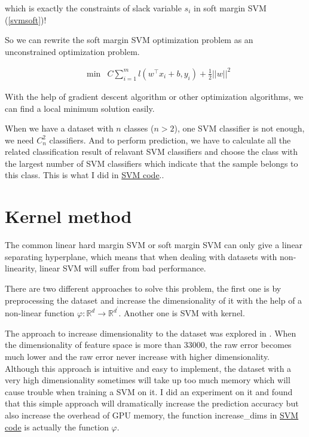 \documentclass[a4paper]{report}
\begin{document}
which is exactly the constraints of slack variable $s_i$ in soft margin SVM (\ref{svmsoft})!

So we can rewrite the soft margin SVM optimization problem as an unconstrained optimization problem.

\begin{align*}
    &\min & C \sum_{i=1}^m l(w^\top x_i+b, y_i) + \frac{1}{2}||w||^2 
\end{align*}

With the help of gradient descent algorithm or other optimization algorithms, we can find a local minimum solution easily.

When we have a dataset with $n$ classes ($n>2$), one SVM classifier is not enough, we need $C_n^2$ classifiers. And to perform prediction, we have to calculate all the related classification result of relavant SVM classifiers and choose the class with the largest number of SVM classifiers which indicate that the sample belongs to this class. This is what I did in \href{https://github.com/chaihahaha/Multiclass-Support-Vector-Machine-Tensorflow}{SVM code}..

\section{Kernel method}

The common linear hard margin SVM or soft margin SVM can only give a linear separating hyperplane, which means that when dealing with datasets with non-linearity, linear SVM will suffer from bad performance.

There are two different approaches to solve this problem, the first one is by preprocessing the dataset and increase the dimensionality of it with the help of a non-linear function $\varphi:\mathbb R^d\to\mathbb R^{d^\prime}$. Another one is SVM with kernel.

The approach to increase dimensionality to the dataset was explored in \cite{cortes1995support}. When the dimensionality of feature space is more than 33000, the raw error becomes much lower and the raw error never increase with higher dimensionality. Although this approach is intuitive and easy to implement, the dataset with a very high dimensionality sometimes will take up too much memory which will cause trouble when training a SVM on it. I did an experiment on it and
found that this simple approach will dramatically increase the prediction accuracy but also increase the overhead of GPU memory, the function increase\_dims in \href{https://github.com/chaihahaha/Multiclass-Support-Vector-Machine-Tensorflow}{SVM code} is actually the function $\varphi$.
\end{document}
